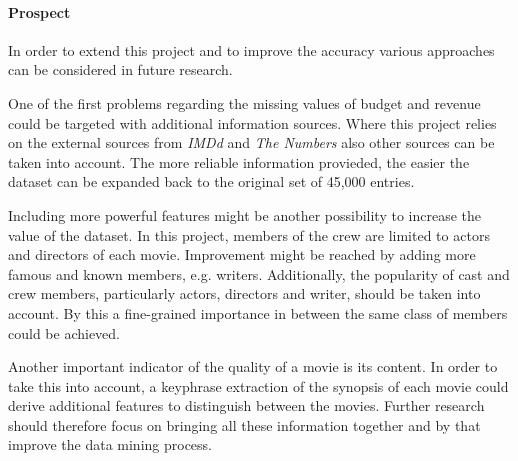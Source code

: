 \paragraph{Prospect}
\label{cha:prospect}
In order to extend this project and to improve the accuracy various approaches can be considered in future research. 

One of the first problems regarding the missing values of budget and revenue could be targeted with additional information sources. Where this project relies on the external sources from \textit{IMDd} and \textit{The Numbers} also other sources can be taken into account. The more reliable information provieded, the easier the dataset can be expanded back to the original set of 45,000 entries.

\normalsize Including more powerful features might be another possibility to increase the value of the dataset. In this project, members of the crew are limited to actors and directors of each movie. Improvement might be reached by adding more famous and known members, e.g. writers. Additionally, the popularity of cast and crew members, particularly actors, directors and writer, should be taken into account. By this a fine-grained importance in between the same class of members could be achieved.

Another important indicator of the quality of a movie is its content. In order to take this into account, a keyphrase extraction of the synopsis of each movie could derive additional features to distinguish between the movies. Further research should therefore focus on bringing all these information together and by that improve the data mining process.

%

